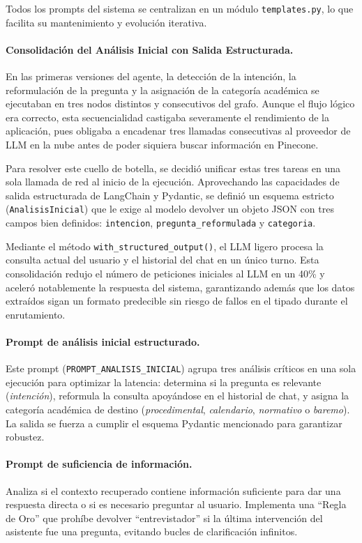 \documentclass[12pt,a4paper,oneside]{report}
\begin{document}
Todos los prompts del sistema se centralizan en un módulo \texttt{templates.py}, lo que facilita su mantenimiento y evolución iterativa.

\paragraph{Consolidación del Análisis Inicial con Salida Estructurada.} En las primeras versiones del agente, la detección de la intención, la reformulación de la pregunta y la asignación de la categoría académica se ejecutaban en tres nodos distintos y consecutivos del grafo. Aunque el flujo lógico era correcto, esta secuencialidad castigaba severamente el rendimiento de la aplicación, pues obligaba a encadenar tres llamadas consecutivas al proveedor de LLM en la nube antes de poder siquiera buscar información en Pinecone. 

Para resolver este cuello de botella, se decidió unificar estas tres tareas en una sola llamada de red al inicio de la ejecución. Aprovechando las capacidades de salida estructurada de LangChain y Pydantic, se definió un esquema estricto (\texttt{AnalisisInicial}) que le exige al modelo devolver un objeto JSON con tres campos bien definidos: \texttt{intencion}, \texttt{pregunta\_reformulada} y \texttt{categoria}. 

Mediante el método \texttt{with\_structured\_output()}, el LLM ligero procesa la consulta actual del usuario y el historial del chat en un único turno. Esta consolidación redujo el número de peticiones iniciales al LLM en un 40\% y aceleró notablemente la respuesta del sistema, garantizando además que los datos extraídos sigan un formato predecible sin riesgo de fallos en el tipado durante el enrutamiento.

\paragraph{Prompt de análisis inicial estructurado.} Este prompt (\texttt{PROMPT\_ANALISIS\_INICIAL}) agrupa tres análisis críticos en una sola ejecución para optimizar la latencia: determina si la pregunta es relevante (\textit{intención}), reformula la consulta apoyándose en el historial de chat, y asigna la categoría académica de destino (\textit{procedimental}, \textit{calendario}, \textit{normativo} o \textit{baremo}). La salida se fuerza a cumplir el esquema Pydantic mencionado para garantizar robustez.

\paragraph{Prompt de suficiencia de información.} Analiza si el contexto recuperado contiene información suficiente para dar una respuesta directa o si es necesario preguntar al usuario. Implementa una ``Regla de Oro'' que prohíbe devolver ``entrevistador'' si la última intervención del asistente fue una pregunta, evitando bucles de clarificación infinitos.
\end{document}
